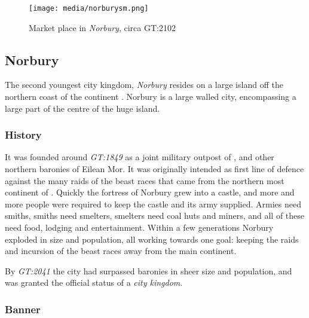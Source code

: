 \begin{figure}[ht!]
  \centering
  \vspace{-2.6cm}
  \centerline{
    \texttt{[image: media/norburysm.png]}
  }
  \par
  Market place in \emph{Norbury}, circa GT:2102
\end{figure}

\subsection{Norbury}
\label{sec:Norbury}


The second youngest city kingdom, \emph{Norbury} resides on a large island off
the northern coast of the continent . Norbury is a
large walled city, encompassing a large part of the centre  of the huge island.

\subsubsection{History}

It was founded around \emph{GT:1849} as a joint military outpost of
, and other northern baronies of Eilean Mor. It was
originally intended as first line of defence against the many raids of the
beast races that came from the northern most continent of
. Quickly the fortress of Norbury grew into a castle,
and more and more people were required to keep the castle and its army
supplied. Armies need smiths, smiths need smelters, smelters need coal huts
and miners, and all of these need food, lodging and entertainment. Within a
few generations Norbury exploded in size and population, all working towards
one goal: keeping the raids and incursion of the beast races away from the
main continent.

By \emph{GT:2041} the city had surpassed baronies in sheer size and population,
and was granted the official status of a \emph{city kingdom}.

\subsubsection{Banner}

